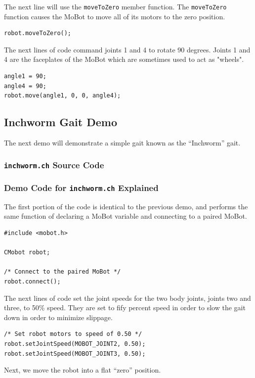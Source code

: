 \documentclass{article}
\begin{document}
The next line will use the \texttt{moveToZero} member function. The
\texttt{moveToZero} function causes the MoBot to move all of its motors to the
zero position.
\begin{verbatim}
robot.moveToZero();
\end{verbatim}

The next lines of code command joints 1 and 4 to rotate 90 degrees.
Joints 1 and 4 are the faceplates
of the MoBot which are sometimes used to act as "wheels".
\begin{verbatim}
angle1 = 90;
angle4 = 90;
robot.move(angle1, 0, 0, angle4);
\end{verbatim}

\subsection{Inchworm Gait Demo}
The next demo will demonstrate a simple gait known as the ``Inchworm'' gait.

\subsubsection{\texttt{inchworm.ch} Source Code}


\subsubsection{Demo Code for \texttt{inchworm.ch} Explained}
The first portion of the code is identical to the previous demo, and performs
the same function of declaring a MoBot variable and connecting to a 
paired MoBot.
\begin{verbatim}
#include <mobot.h>

CMobot robot;

/* Connect to the paired MoBot */
robot.connect();
\end{verbatim}

The next lines of code set the joint speeds for the two body joints, joints 
two and three, to 50\% speed. They are set to fify percent speed in order to 
slow the gait down in order to minimize slippage.

\begin{verbatim}
/* Set robot motors to speed of 0.50 */
robot.setJointSpeed(MOBOT_JOINT2, 0.50);
robot.setJointSpeed(MOBOT_JOINT3, 0.50);
\end{verbatim}

Next, we move the robot into a flat ``zero'' position.
\end{document}

